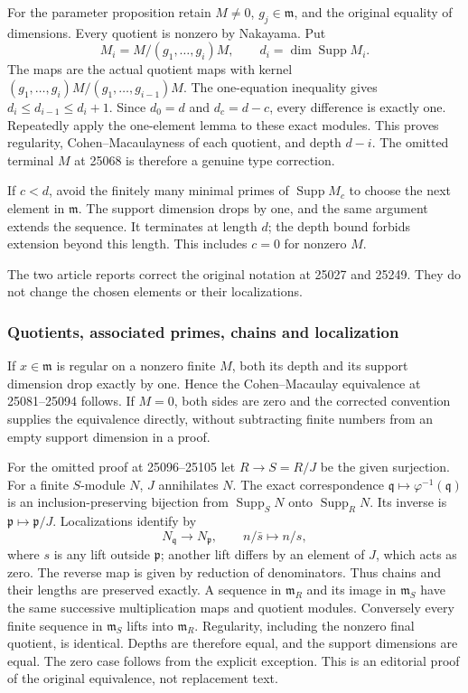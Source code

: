 For the parameter proposition retain \(M\ne0\), \(g_j\in\mathfrak m\), and the original equality of dimensions. Every quotient is nonzero by Nakayama. Put \[
 M_i=M/(g_1,\ldots,g_i)M,\qquad d_i=\dim\operatorname{Supp}M_i.
\] The maps are the actual quotient maps with kernel \((g_1,\ldots,g_i)M/(g_1,\ldots,g_{i-1})M\). The one-equation inequality gives \(d_i\le d_{i-1}\le d_i+1\). Since \(d_0=d\) and \(d_c=d-c\), every difference is exactly one. Repeatedly apply the one-element lemma to these exact modules. This proves regularity, Cohen--Macaulayness of each quotient, and depth \(d-i\). The omitted terminal \(M\) at 25068 is therefore a genuine type correction.

If \(c<d\), avoid the finitely many minimal primes of \(\operatorname{Supp}M_c\) to choose the next element in \(\mathfrak m\). The support dimension drops by one, and the same argument extends the sequence. It terminates at length \(d\); the depth bound forbids extension beyond this length. This includes \(c=0\) for nonzero \(M\).

The two article reports correct the original notation at 25027 and 25249. They do not change the chosen elements or their localizations.

\subsubsection{Quotients, associated primes, chains and localization}\label{algebra-proof-019-quotients-associated-primes-chains-and-localization}

If \(x\in\mathfrak m\) is regular on a nonzero finite \(M\), both its depth and its support dimension drop exactly by one. Hence the Cohen--Macaulay equivalence at 25081--25094 follows. If \(M=0\), both sides are zero and the corrected convention supplies the equivalence directly, without subtracting finite numbers from an empty support dimension in a proof.

For the omitted proof at 25096--25105 let \(R\to S=R/J\) be the given surjection. For a finite \(S\)-module \(N\), \(J\) annihilates \(N\). The exact correspondence \(\mathfrak q\mapsto\varphi^{-1}(\mathfrak q)\) is an inclusion-preserving bijection from \(\operatorname{Supp}_S N\) onto \(\operatorname{Supp}_R N\). Its inverse is \(\mathfrak p\mapsto\mathfrak p/J\). Localizations identify by \[
 N_{\mathfrak q}\longrightarrow N_{\mathfrak p},\qquad n/\bar s\longmapsto n/s,
\] where \(s\) is any lift outside \(\mathfrak p\); another lift differs by an element of \(J\), which acts as zero. The reverse map is given by reduction of denominators. Thus chains and their lengths are preserved exactly. A sequence in \(\mathfrak m_R\) and its image in \(\mathfrak m_S\) have the same successive multiplication maps and quotient modules. Conversely every finite sequence in \(\mathfrak m_S\) lifts into \(\mathfrak m_R\). Regularity, including the nonzero final quotient, is identical. Depths are therefore equal, and the support dimensions are equal. The zero case follows from the explicit exception. This is an editorial proof of the original equivalence, not replacement text.

